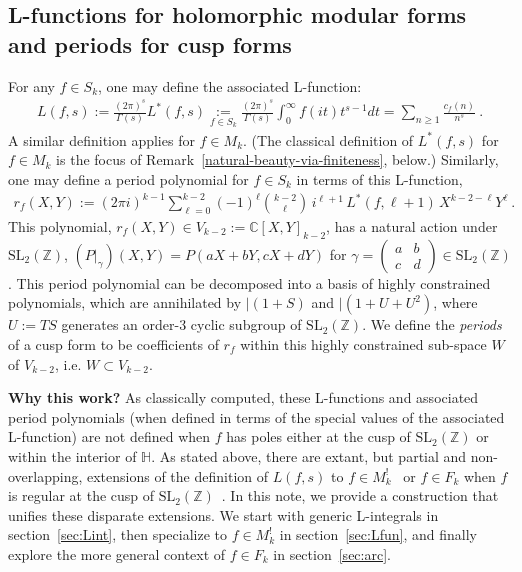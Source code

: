 \documentclass[11pt]{article}
\newcommand{\HH}{\mathbb{H}}
\newcommand{\ZZ}{\mathbb{Z}}
\newcommand{\CC}{\mathbb{C}}
\newcommand{\SLZ}{\mathrm{SL}_2(\ZZ)}
\begin{document}
\subsection{L-functions for holomorphic modular forms and periods for cusp forms}

For any $f \in S_k$, one may define the associated L-function:
\begin{align}
L(f,s) := \frac{(2 \pi)^s}{\Gamma(s)} L^*(f,s) \underset{f \in S_k}{:=} 
\frac{(2 \pi)^s}{\Gamma(s)} \int_0^{\infty} f(it) t^{s-1} dt = \sum_{n \geq 1} \frac{c_f(n)}{n^s}~.
\end{align}
A similar definition applies for $f \in M_k$. (The classical definition of $L^*(f,s)$ for $f \in M_k$ 
is the focus of Remark~\ref{natural-beauty-via-finiteness}, below.) Similarly, one may define a period 
polynomial for $f \in S_k$ in terms of this L-function,
\begin{align}
r_f(X, Y) := (2 \pi i)^{k-1} \sum_{\ell = 0}^{k-2} (-1)^\ell \binom{k-2}{\ell}\, i^{\ell+1}\, L^*(f,\ell+1)\,X^{k-2-\ell}Y^\ell~.
\end{align}
This polynomial, $r_f(X, Y) \in V_{k-2} := \CC[X, Y]_{k-2}$, has a natural action under $\SLZ$, 
$(P|_{\gamma})(X, Y) = P(a X + b Y, c X + d Y)$ for $\gamma = 
\left( \begin{smallmatrix} a & b \\ c & d \end{smallmatrix} \right) \in \SLZ$. This period polynomial 
can be decomposed into a basis of highly constrained polynomials, which are annihilated by $|(1+S)$
and $|(1 + U + U^2)$\cite{KZ1984}, where $U := TS$ generates an order-3 cyclic subgroup of $\SLZ$.
We define the \emph{periods} of a cusp form to be coefficients of $r_f$ within this highly 
constrained sub-space $W$ of $V_{k-2}$, i.e. $W \subset V_{k-2}$.

{\bf Why this work?} As classically computed, these L-functions and associated period polynomials 
(when defined in terms of the special values of the associated L-function) are not defined when $f$ 
has poles either at the cusp of $\SLZ$ or within the interior of $\HH$. As stated above, there 
are extant, but partial and non-overlapping, extensions of the definition of $L(f,s)$ to $f \in M_k^!$~\cite{BFK2011} or 
$f \in F_k$ when $f$ is regular at the cusp of $\SLZ$~\cite{1806}. In this note, we provide a construction that unifies these disparate extensions.
We start with generic L-integrals in section~\ref{sec:Lint}, then specialize to $f \in M_k^!$ in section~\ref{sec:Lfun}, and finally explore the more general context of $f \in F_k$ in section~\ref{sec:arc}.
\end{document}

